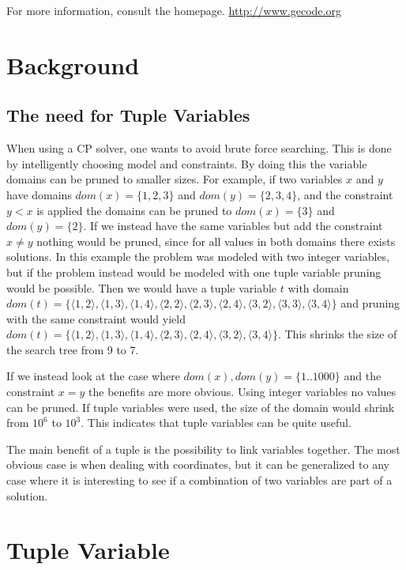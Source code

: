 \documentclass[a4paper,11pt]{article}
\begin{document}
For more information, consult the homepage. \url{http://www.gecode.org}

\section{Background}
\subsection{The need for Tuple Variables}
When using a CP solver, one wants to avoid brute force searching. This is done by intelligently choosing model and constraints. By doing this the variable domains can be pruned to smaller sizes. For example, if two variables $x$ and $y$ have domains $dom(x)=\{1,2,3\}$ and $dom(y)=\{2,3,4\}$, and the constraint $y<x$ is applied the domains can be pruned to $dom(x)=\{3\}$ and $dom(y)=\{2\}$. If we instead have the same variables but add the constraint $x\neq y$ nothing would be pruned, since for all values in both domains there exists solutions. In this example the problem was modeled with two integer variables, but if the problem instead would be modeled with one tuple variable pruning would be possible. Then we would have a tuple variable $t$ with domain $dom(t)=\{\langle1,2\rangle,\langle1,3\rangle,\langle1,4\rangle,\langle2,2\rangle,\langle2,3\rangle,\langle2,4\rangle,\langle3,2\rangle,\langle3,3\rangle,\langle3,4\rangle\}$ and pruning with the same constraint would yield $dom(t)=\{\langle1,2\rangle,\langle1,3\rangle,\langle1,4\rangle,\langle2,3\rangle,\langle2,4\rangle,\langle3,2\rangle,\langle3,4\rangle\}$. This shrinks the size of the search tree from 9 to 7. 

If we instead look at the case where $dom(x),dom(y)=\{1..1000\}$ and the constraint $x=y$ the benefits are more obvious. Using integer variables no values can be pruned. If tuple variables were used, the size of the domain would shrink from $10^6$ to $10^3$. This indicates that tuple variables can be quite useful.

The main benefit of a tuple is the possibility to link variables together. The most obvious case is when dealing with coordinates, but it can be generalized to any case where it is interesting to see if a combination of two variables are part of a solution.

\section{Tuple Variable}
\end{document}
